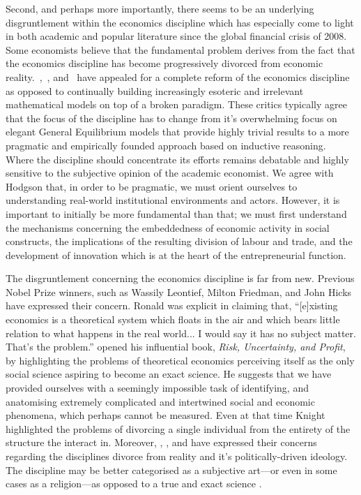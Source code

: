Second, and perhaps more importantly, there seems to be an underlying disgruntlement within the economics discipline which has especially come to light in both academic and popular literature since the global financial crisis of 2008. Some economists believe that the fundamental problem derives from the fact that the economics discipline has become progressively divorced from economic reality.~\citet{Hodgson2009},~\citet{Smith2010}, and~\citet{Keen2011} have appealed for a complete reform of the economics discipline as opposed to continually building increasingly esoteric and irrelevant mathematical models on top of a broken paradigm. These critics typically agree that the focus of the discipline has to change from it's overwhelming focus on elegant General Equilibrium models that provide highly trivial results to a more pragmatic and empirically founded approach based on inductive reasoning. Where the discipline should concentrate its efforts remains debatable and highly sensitive to the subjective opinion of the academic economist. We agree with Hodgson that, in order to be pragmatic, we must orient ourselves to understanding real-world institutional environments and actors. However, it is important to initially be more fundamental than that; we must first understand the mechanisms concerning the embeddedness of economic activity in social constructs, the implications of the resulting division of labour and trade, and the development of innovation which is at the heart of the entrepreneurial function.

The disgruntlement concerning the economics discipline is far from new. Previous Nobel Prize winners, such as Wassily Leontief, Milton Friedman, and John Hicks have expressed their concern. Ronald \citet{Coase1997} was explicit in claiming that, ``[e]xisting economics is a theoretical system which floats in the air and which bears little relation to what happens in the real world... I would say it has no subject matter. That's the problem.'' \citet{Knight1921} opened his influential book, \textit{Risk, Uncertainty, and Profit}, by highlighting the problems of theoretical economics perceiving itself as the only social science aspiring to become an exact science. He suggests that we have provided ourselves with a seemingly impossible task of identifying, and anatomising extremely complicated and intertwined social and economic phenomena, which perhaps cannot be measured. Even at that time Knight highlighted the problems of divorcing a single individual from the entirety of the structure the interact in. Moreover, \citet{Krugman2009}, \citet{Stiglitz2010}, and \citet{Varoufakis2011} have expressed their concerns regarding the disciplines divorce from reality and it's politically-driven ideology. The discipline may be better categorised as a subjective art---or even in some cases as a religion---as opposed to a true and exact science \citep{Backhouse2010}.

